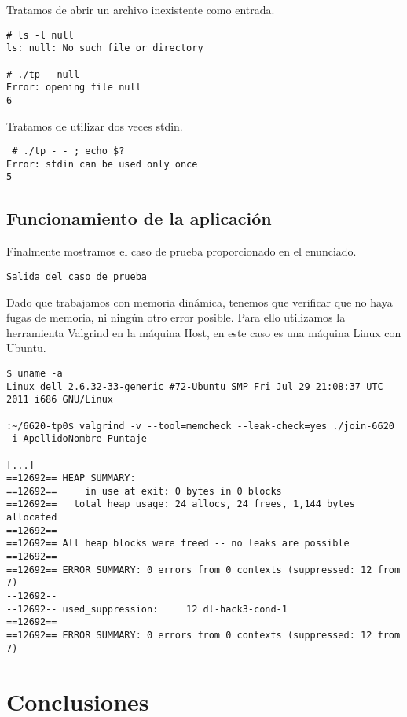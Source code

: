 \documentclass[a4paper, 10pt, twoside, notitlepage]{article}
\begin{document}
Tratamos de abrir un archivo inexistente como entrada.
\scriptsize
\begin{verbatim}
# ls -l null
ls: null: No such file or directory

# ./tp - null
Error: opening file null
6
\end{verbatim}
\normalsize

Tratamos de utilizar dos veces stdin.
\scriptsize
\begin{verbatim}
 # ./tp - - ; echo $?
Error: stdin can be used only once
5
\end{verbatim}
\normalsize


\subsection{Funcionamiento de la aplicación}


Finalmente mostramos el caso de prueba proporcionado en el enunciado.
\scriptsize
\begin{verbatim}
Salida del caso de prueba
\end{verbatim}
\normalsize

Dado que trabajamos con memoria dinámica, tenemos que verificar que no haya fugas de memoria, ni ningún otro error posible. Para ello utilizamos la herramienta Valgrind en la máquina Host, en este caso es una máquina Linux con Ubuntu.

\scriptsize
\begin{verbatim}
$ uname -a
Linux dell 2.6.32-33-generic #72-Ubuntu SMP Fri Jul 29 21:08:37 UTC 2011 i686 GNU/Linux

:~/6620-tp0$ valgrind -v --tool=memcheck --leak-check=yes ./join-6620 -i ApellidoNombre Puntaje

[...]
==12692== HEAP SUMMARY:
==12692==     in use at exit: 0 bytes in 0 blocks
==12692==   total heap usage: 24 allocs, 24 frees, 1,144 bytes allocated
==12692== 
==12692== All heap blocks were freed -- no leaks are possible
==12692== 
==12692== ERROR SUMMARY: 0 errors from 0 contexts (suppressed: 12 from 7)
--12692-- 
--12692-- used_suppression:     12 dl-hack3-cond-1
==12692== 
==12692== ERROR SUMMARY: 0 errors from 0 contexts (suppressed: 12 from 7)

\end{verbatim}
\normalsize

\newpage
\section{Conclusiones}
\end{document}
